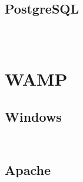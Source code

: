 \begin{lstlisting}[language=bash]

\end{lstlisting}




\begin{lstlisting}[language=bash]

\end{lstlisting}


\section{PostgreSQL}


\begin{lstlisting}[language=bash]

\end{lstlisting}




\begin{lstlisting}[language=bash]

\end{lstlisting}




\begin{lstlisting}[language=bash]

\end{lstlisting}


\chapter{WAMP}



\section{Windows}


\begin{lstlisting}[language=bash]

\end{lstlisting}




\begin{lstlisting}[language=bash]

\end{lstlisting}



\section{Apache}


